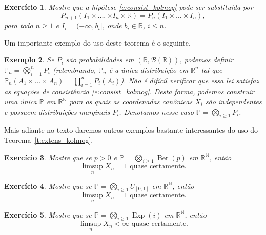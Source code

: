 \documentclass[reqno, final]{book}
\newcommand*\1{\mathds{1}}
\newtheorem{example}{Exemplo}[section]
\newtheorem{exercise}[example]{Exercício}
\DeclareMathOperator{\Ber}{Ber}
\DeclareMathOperator{\Exp}{Exp}
\begin{document}
\begin{exercise}
  Mostre que a hipótese \eqref{e:consist_kolmog} pode ser substituida por
  \begin{equation}
    P_{n+1} (I_1 \times \dots, \times I_n \times \mathbb{R}) = P_n (I_1 \times \dots \times I_n),
  \end{equation}
  para todo $n \geq 1$ e $I_i = (-\infty, b_i]$, onde $b_i \in \mathbb{R}$, $i \leq n$.
\end{exercise}

Um importante exemplo do uso deste teorema é o seguinte.

\begin{example}
  Se $P_i$ são probabilidades em $(\mathbb{R}, \mathcal{B}(\mathbb{R}))$, podemos definir $\mathbb{P}_n = \bigotimes_{i=1}^n P_i$ (relembrando, $\mathbb{P}_n$ é a única distribuição em $\mathbb{R}^n$ tal que $\mathbb{P}_n(A_1 \times \dots \times A_n) = \prod_{i=1}^n P_i(A_i)$).
  Não é difícil verificar que essa lei satisfaz as equações de consistência \eqref{e:consist_kolmog}.
  Desta forma, podemos construir uma única $\mathbb{P}$ em $\mathbb{R}^\mathbb{N}$ para os quais as coordenadas canônicas $X_i$ são independentes e possuem distribuições marginais $P_i$.
  Denotamos nesse caso $\mathbb{P} = \bigotimes_{i \geq 1} P_i$.
\end{example}

Mais adiante no texto daremos outros exemplos bastante interessantes do uso do Teorema~\ref{t:extens_kolmog}.

\begin{exercise}
  Mostre que se $p > 0$ e $\mathbb{P} = \bigotimes_{i \geq 1} \Ber(p)$ em $\mathbb{R}^\mathbb{N}$, então
  \begin{equation}
    \text{$\limsup_n X_n = 1$ quase certamente.}
  \end{equation}
\end{exercise}

\begin{exercise}
  Mostre que se $\mathbb{P} = \bigotimes_{i \geq 1} U_{[0,1]}$ em $\mathbb{R}^\mathbb{N}$, então
  \begin{equation}
    \text{$\limsup_n X_n = 1$ quase certamente.}
  \end{equation}
\end{exercise}

\begin{exercise}
  Mostre que se $\mathbb{P} = \bigotimes_{i \geq 1} \Exp(i)$ em $\mathbb{R}^\mathbb{N}$, então
  \begin{equation}
    \text{$\limsup_n X_n < \infty$ quase certamente.}
  \end{equation}
\end{exercise}
\end{document}
